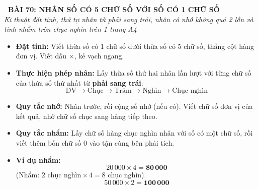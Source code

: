 \documentclass[11pt,a4paper]{article}
\begin{document}
\begin{tcolorbox}[
  enhanced,
  colback=white,
  colframe=primary,
  arc=3mm,
  boxrule=1.2pt,
  left=4mm, right=4mm, top=2.5mm, bottom=2.5mm,
  drop shadow=black!10!white
]
  \centering
  {\Large\bfseries\color{primary}\faBookmark\ BÀI 70: NHÂN SỐ CÓ 5 CHỮ SỐ VỚI SỐ CÓ 1 CHỮ SỐ}\\[1.5mm]
  {\small\itshape\color{black!75}Kĩ thuật đặt tính, thứ tự nhân từ phải sang trái, nhân có nhớ không quá 2 lần và tính nhẩm tròn chục nghìn trên 1 trang A4}
\end{tcolorbox}

\vspace{-2mm}


\noindent
\begin{minipage}[t]{0.49\textwidth}\vspace{0pt}
\begin{tcolorbox}[
  enhanced,
  colback=blue!4!white,
  colframe=blue!75!black,
  arc=2mm, boxrule=0.8pt,
  left=2mm, right=2mm, top=1.8mm, bottom=1.8mm,
  title={\footnotesize\bfseries\color{white}\faTimes\ 1. Quy trình Đặt tính rồi tính}
]
{\footnotesize
\begin{itemize}\setlength{\itemsep}{1.5pt}\setlength{\leftskip}{-2.5mm}
  \item \textbf{Đặt tính:} Viết thừa số có 1 chữ số dưới thừa số có 5 chữ số, thẳng cột hàng đơn vị. Viết dấu $\times$, kẻ vạch ngang.
  \item \textbf{Thực hiện phép nhân:} Lấy thừa số thứ hai nhân lần lượt với từng chữ số của thừa số thứ nhất từ \textbf{phải sang trái}:
  $$\text{ĐV} \to \text{Chục} \to \text{Trăm} \to \text{Nghìn} \to \text{Chục nghìn}$$
  \item \textbf{Quy tắc nhớ:} Nhân trước, rồi cộng số nhớ (nếu có). Viết chữ số đơn vị của kết quả, nhớ chữ số chục sang hàng tiếp theo.
\end{itemize}
}
\end{tcolorbox}
\end{minipage}
\hfill
\begin{minipage}[t]{0.49\textwidth}\vspace{0pt}
\begin{tcolorbox}[
  enhanced,
  colback=teal!4!white,
  colframe=teal!75!black,
  arc=2mm, boxrule=0.8pt,
  left=2mm, right=2mm, top=1.8mm, bottom=1.8mm,
  title={\footnotesize\bfseries\color{white}\faKey\ 2. Nhân nhẩm số tròn chục nghìn}
]
{\footnotesize
\begin{itemize}\setlength{\itemsep}{1.5pt}\setlength{\leftskip}{-2.5mm}
  \item \textbf{Quy tắc nhẩm:}
  Lấy chữ số hàng chục nghìn nhân với số có một chữ số, rồi viết thêm bốn chữ số $0$ vào tận cùng bên phải tích.
  \item \textbf{Ví dụ nhẩm:}
  $$20\,000 \times 4 = \mathbf{80\,000}$$
  (Nhẩm: $2\text{ chục nghìn} \times 4 = 8\text{ chục nghìn}$).
  $$50\,000 \times 2 = \mathbf{100\,000}$$
\end{itemize}
}
\end{tcolorbox}
\end{minipage}
\end{document}

